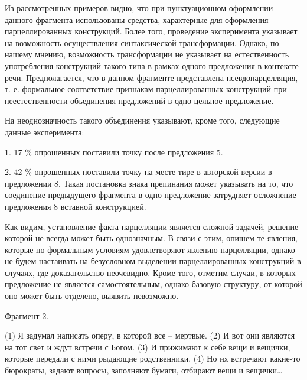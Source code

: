 \documentclass{kursa4}
\begin{document}
    \textcolor[rgb]{0.2,0.2,0.2}{}\textcolor[rgb]{0.2,0.2,0.2}{Из
    рассмотренных примеров видно, что при пунктуационном оформлении данного
    фрагмента использованы средства, характерные для оформления
    парцеллированных конструкций. Более того, проведение эксперимента
    указывает на возможность осуществления синтаксической трансформации.
    Однако, по нашему мнению, возможность трансформации не указывает на
    естественность употребления конструкций такого типа в рамках одного
    предложения в контексте речи.
    }\textcolor[rgb]{0.2,0.2,0.2}{Предполагается, что в данном фрагменте
    представлена псевдопарцелляция, т. е. формальное соответствие признакам
    парцеллированных конструкций при неестественности объединения
    предложений в одно цельное предложение. }

    \textcolor[rgb]{0.2,0.2,0.2}{}\textcolor[rgb]{0.2,0.2,0.2}{На
    неоднозначность такого объединения указывают, кроме того, следующие
    данные эксперимента:}

    \textcolor[rgb]{0.2,0.2,0.2}{1. 17 \% опрошенных поставили точку
    после предложения 5.}

    \textcolor[rgb]{0.2,0.2,0.2}{2. }\textcolor[rgb]{0.2,0.2,0.2}{42 \%
    опрошенных поставили точку на месте тире в авторской версии в
    предложении 8. Такая постановка знака препинания может указывать на то,
    что соединение предыдущего фрагмента в одно предложение затрудняет
    осложнение предложения 8 вставной конструкцией. }


    \bigskip

    \textcolor[rgb]{0.2,0.2,0.2}{Как видим, установление факта
    парцелляции является сложной задачей, решение которой не всегда может
    быть однозначным. В связи с этим, опишем те явления, которые по
    формальным условиям удовлетворяют явлению парцелляции, однако не будем
    настаивать на безусловном выделении парцеллированных конструкций в
    случаях, где доказательство неочевидно. Кроме того, отметим случаи, в
    которых предложение не
    }\textcolor[rgb]{0.2,0.2,0.2}{является}\textcolor[rgb]{0.2,0.2,0.2}{
    самостоятельным, однако базовую структуру, от которой оно может быть
    отделено, выявить невозможно. }

    \textcolor[rgb]{0.2,0.2,0.2}{Фрагмент 2. }

    \textcolor[rgb]{0.2,0.2,0.2}{(1) Я задумал написать оперу, в которой
    все – мертвые. (2) И вот они являются на тот свет и ждут встречи с
    Богом. (3) И прижимают к себе вещи и вещички, которые передали с ними
    рыдающие родственники. (4) Но их встречают какие-то бюрократы, задают
    вопросы, заполняют бумаги, отбирают вещи и вещички…}
\end{document}
